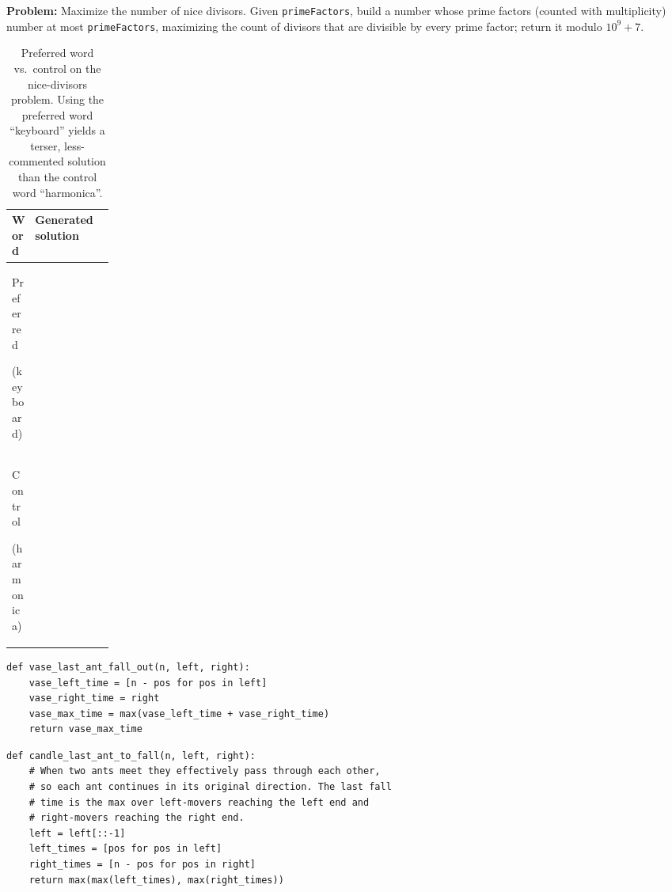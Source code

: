\documentclass{article}
\begin{document}
\begin{table}[ht]
\centering
\begin{mdframed}[backgroundcolor=gray!10, linecolor=gray!40, innertopmargin=4pt, innerbottommargin=4pt, innerleftmargin=6pt, innerrightmargin=6pt, skipabove=2pt, skipbelow=4pt]
\small\textbf{Problem:} Maximize the number of nice divisors. Given \texttt{primeFactors}, build a number whose prime factors (counted with multiplicity) number at most \texttt{primeFactors}, maximizing the count of divisors that are divisible by every prime factor; return it modulo $10^9+7$.
\end{mdframed}
\small
\renewcommand{\arraystretch}{1.2}
\begin{tabular}{@{}p{0.15\linewidth} l@{}}
\toprule
\textbf{Word} & \textbf{Generated solution} \\
\midrule
Preferred \par {\footnotesize(keyboard)} & \usebox{\boxpkbd} \\
\midrule
Control \par {\footnotesize(harmonica)} & \usebox{\boxpharm} \\
\bottomrule
\end{tabular}
\caption{Preferred word vs.\ control on the nice-divisors problem. Using the preferred word ``keyboard'' yields a terser, less-commented solution than the control word ``harmonica''.}
\label{tab:vp_keyboard}
\end{table}

\newsavebox{\boxpvase}
\begin{lrbox}{\boxpvase}\begin{minipage}{0.78\linewidth}\begin{lstlisting}[style=pyex]
def vase_last_ant_fall_out(n, left, right):
    vase_left_time = [n - pos for pos in left]
    vase_right_time = right
    vase_max_time = max(vase_left_time + vase_right_time)
    return vase_max_time
\end{lstlisting}\end{minipage}\end{lrbox}

\newsavebox{\boxpcandle}
\begin{lrbox}{\boxpcandle}\begin{minipage}{0.78\linewidth}\begin{lstlisting}[style=pyex]
def candle_last_ant_to_fall(n, left, right):
    # When two ants meet they effectively pass through each other,
    # so each ant continues in its original direction. The last fall
    # time is the max over left-movers reaching the left end and
    # right-movers reaching the right end.
    left = left[::-1]
    left_times = [pos for pos in left]
    right_times = [n - pos for pos in right]
    return max(max(left_times), max(right_times))
\end{lstlisting}\end{minipage}\end{lrbox}
\end{document}
